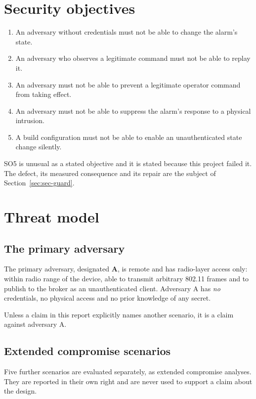 \section{Security objectives}

\begin{enumerate}[leftmargin=2.4em,itemsep=4pt,label=\textbf{SO\arabic*.}]
  \item An adversary without credentials must not be able to change the alarm's state.
  \item An adversary who observes a legitimate command must not be able to replay it.
  \item An adversary must not be able to prevent a legitimate operator command from taking
        effect.
  \item An adversary must not be able to suppress the alarm's response to a physical intrusion.
  \item A build configuration must not be able to enable an unauthenticated state change
        silently.
\end{enumerate}

SO5 is unusual as a stated objective and it is stated because this project failed it. The
defect, its measured consequence and its repair are the subject of
Section~\ref{sec:sec-guard}.

\section{Threat model}

\subsection{The primary adversary}

The primary adversary, designated \textbf{A}, is remote and has radio-layer access only: within
radio range of the device, able to transmit arbitrary 802.11 frames and to publish to the broker
as an unauthenticated client. Adversary A has \emph{no} credentials, no physical access and no
prior knowledge of any secret.

Unless a claim in this report explicitly names another scenario, it is a claim against
adversary A.

\subsection{Extended compromise scenarios}

Five further scenarios are evaluated separately, as extended compromise analyses. They are
reported in their own right and are never used to support a claim about the design.

